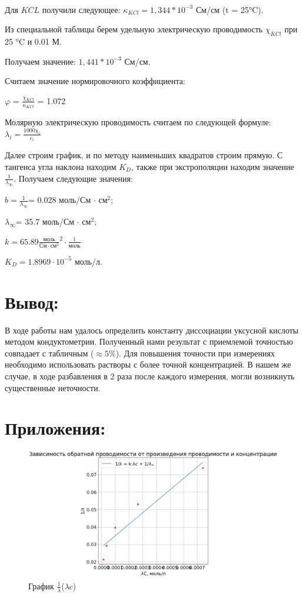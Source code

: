 \documentclass[a4paper,12pt]{article}
\begin{document}
\paragraph{}

Для $KCL$ получили следующее: $\kappa_{KCl}  = 1,344 * 10^{-3}$ См/см (t = 25°C).

Из специальной таблицы берем удельную электрическую проводимость $\chi_{KCl}$ при 25 °C и 0.01 М. 

Получаем значение: $1,441 * 10^{-3}$ См/см.

Считаем значение нормировочного коэффициента: 

$\varphi$ = $\frac{\chi_{KCl}}{\kappa_{KCl}}$ = 1.072

Молярную электрическую проводимость считаем по следующей формуле: $\lambda_{i} = \frac{1000 \chi_{i}}{ c_i}$

Далее строим график, и по методу наименьших квадратов строим прямую. С тангенса угла наклона находим $K_D$, также при экстрополяции находим значение $\frac{1}{\lambda_{\infty}}$. Получаем следующие значения:

$b = \frac{1}{\lambda_{\infty}}$= 0.028 моль/См $\cdot$ см$^2$;

$\lambda_{\infty}$= 35.7 моль/См $\cdot$ см$^2$;

$k = 65.89 \frac{\text{моль}}{\text{См} \cdot \text{см}^2}^2 \cdot \frac{1}{\text{моль}}$

$K_D = 1.8969 \cdot 10^{-5} $ моль/л. 

\section*{Вывод:}

В ходе работы нам удалось определить константу диссоциации уксусной кислоты методом кондуктометрии. Полученный нами результат с приемлемой точностью совпадает с табличным ($\approx 5 \%$). Для повышения точности при измерениях необходимо использовать растворы с более точной концентрацией. В нашем же случае, в ходе разбавления в 2 раза после каждого измерения, могли возникнуть существенные неточности.

\section*{Приложения:}
\begin{figure}[H]
    \centering
    \includegraphics[scale=0.55]{image.png}
    \caption{График $\frac{1}{\lambda}$($\lambda c$)}
\end{figure}
\end{document}

